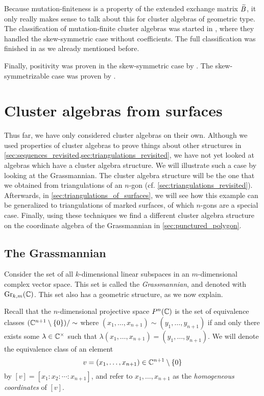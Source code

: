 Because mutation-finiteness is a property of the extended exchange matrix $\widetilde{B}$, it
only really makes sense to talk about this for cluster algebras of geometric type. The
classification of mutation-finite cluster algebras was started in
\cite{FeliksonShapiroTumarkin2012SkewSCA}, where they handled the skew-symmetric case
without coefficients. The full classification was finished in
\cite{FeliksonPavel2023cluster} as we already mentioned before.

Finally, positivity was proven in the skew-symmetric case by
\textcite{LeeSchiffler2015PositivityCA}. The skew-symmetrizable case was proven by
\textcite{GrossHackingKeelKontsevich2018CanonicalBCA}.

\section{Cluster algebras from surfaces}\label{sec:cluster_algebras_surfaces}

Thus far, we have only considered cluster algebras on their own. Although we used
properties of cluster algebras to prove things about other structures in
\cref{sec:sequences_revisited,sec:triangulations_revisited}, we have not yet looked at
algebras which have a cluster algebra structure. We will illustrate such a case by
looking at the Grassmannian. The cluster algebra structure will be the one that we
obtained from triangulations of an $n$-gon (cf. \cref{sec:triangulations_revisited}).
Afterwards, in \cref{sec:triangulations_of_surfaces}, we will see how this example can
be generalized to triangulations of marked surfaces, of which $n$-gons are a special
case. Finally, using these techniques we find a different cluster algebra structure on
the coordinate algebra of the Grassmannian in \cref{sec:punctured_polygon}.

\subsection{The Grassmannian}

Consider the set of all $k$-dimensional linear subspaces in an $m$-dimensional complex
vector space. This set is called the \emph{Grassmannian}, and
denoted with $\operatorname{Gr}_{k,m}(\mathbb{C})$. This set also has a
geometric structure, as we now explain.

Recall that the $n$-dimensional projective space $P^n(\mathbb{C})$ is the set of equivalence
classes $(\mathbb{C}^{n+1} \setminus \{0\}) / \sim$ where $ (x_1, \dots, x_{n+1}) \sim (y_1,
	\dots, y_{n+1})$ if and only there exists some $\lambda \in \mathbb{C}^\times$ such that
$\lambda(x_1, \dots, x_{n+1}) = (y_1, \dots, y_{n+1})$. We will denote the equivalence
class of an element
\begin{equation*}
	v = (x_1, \dots, x_{n+1}) \in \mathbb{C}^{n+1} \setminus \{0\}
\end{equation*}
%
by $[v] = [x_1 \colon x_2 \colon \dotsb \colon x_{n+1}]$, and refer to $x_1, \dots,
	x_{n+1}$ as the \emph{homogeneous coordinates} of $[v]$.


